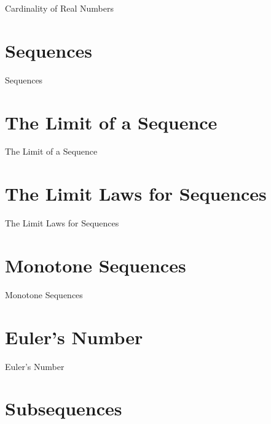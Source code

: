 Cardinality of Real Numbers

\section{Sequences}
\label{sec:sequences}

Sequences

\section{The Limit of a Sequence}
\label{sec:the-limit-of-a-sequence}

The Limit of a Sequence

\section{The Limit Laws for Sequences}
\label{sec:the-limit-laws-for-sequences}

The Limit Laws for Sequences

\section{Monotone Sequences}
\label{sec:monotone-sequences}

Monotone Sequences

\section{Euler's Number}
\label{sec:euler-s-number}

Euler's Number

\section{Subsequences}
\label{sec:subsequences}

